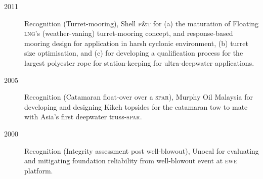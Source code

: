 \begin{description}
\item[2011]Recognition (Turret-mooring), Shell \textsc{p\&t} for (a) the maturation of Floating \textsc{lng}'s (weather-vaning) turret-mooring concept, and response-based mooring design for application in harsh cyclonic environment, (b) turret size optimisation, and (c) for developing a qualification process for the largest polyester rope for station-keeping for ultra-deepwater applications.

\item[2005]Recognition (Catamaran float-over over a \textsc{spar}), Murphy Oil Malaysia for developing and designing Kikeh topsides for the catamaran tow to mate with Asia's first deepwater truss-\textsc{spar}.


\item[2000]Recognition (Integrity assessment post well-blowout), Unocal for evaluating and mitigating foundation reliability from well-blowout event at \textsc{ewe} platform.

\end{description}

